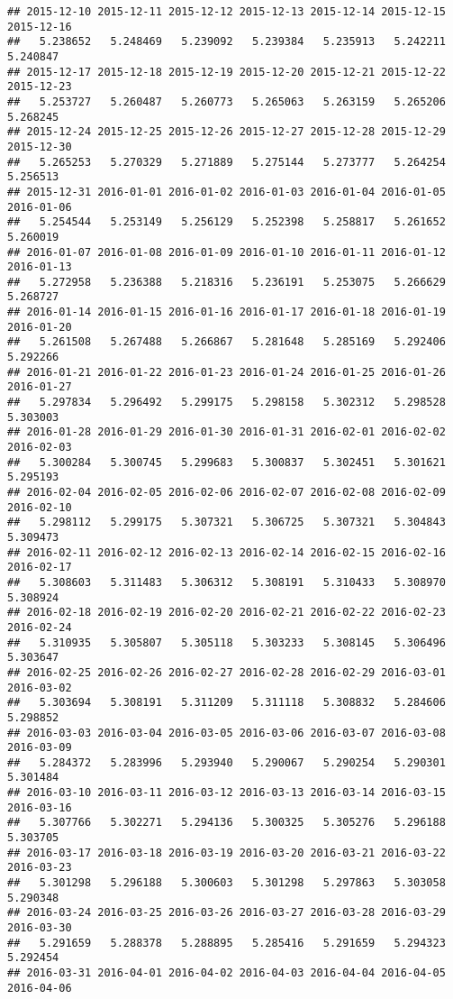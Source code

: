 \documentclass[
]{article}
\begin{document}
\begin{verbatim}
## 2015-12-10 2015-12-11 2015-12-12 2015-12-13 2015-12-14 2015-12-15 2015-12-16 
##   5.238652   5.248469   5.239092   5.239384   5.235913   5.242211   5.240847 
## 2015-12-17 2015-12-18 2015-12-19 2015-12-20 2015-12-21 2015-12-22 2015-12-23 
##   5.253727   5.260487   5.260773   5.265063   5.263159   5.265206   5.268245 
## 2015-12-24 2015-12-25 2015-12-26 2015-12-27 2015-12-28 2015-12-29 2015-12-30 
##   5.265253   5.270329   5.271889   5.275144   5.273777   5.264254   5.256513 
## 2015-12-31 2016-01-01 2016-01-02 2016-01-03 2016-01-04 2016-01-05 2016-01-06 
##   5.254544   5.253149   5.256129   5.252398   5.258817   5.261652   5.260019 
## 2016-01-07 2016-01-08 2016-01-09 2016-01-10 2016-01-11 2016-01-12 2016-01-13 
##   5.272958   5.236388   5.218316   5.236191   5.253075   5.266629   5.268727 
## 2016-01-14 2016-01-15 2016-01-16 2016-01-17 2016-01-18 2016-01-19 2016-01-20 
##   5.261508   5.267488   5.266867   5.281648   5.285169   5.292406   5.292266 
## 2016-01-21 2016-01-22 2016-01-23 2016-01-24 2016-01-25 2016-01-26 2016-01-27 
##   5.297834   5.296492   5.299175   5.298158   5.302312   5.298528   5.303003 
## 2016-01-28 2016-01-29 2016-01-30 2016-01-31 2016-02-01 2016-02-02 2016-02-03 
##   5.300284   5.300745   5.299683   5.300837   5.302451   5.301621   5.295193 
## 2016-02-04 2016-02-05 2016-02-06 2016-02-07 2016-02-08 2016-02-09 2016-02-10 
##   5.298112   5.299175   5.307321   5.306725   5.307321   5.304843   5.309473 
## 2016-02-11 2016-02-12 2016-02-13 2016-02-14 2016-02-15 2016-02-16 2016-02-17 
##   5.308603   5.311483   5.306312   5.308191   5.310433   5.308970   5.308924 
## 2016-02-18 2016-02-19 2016-02-20 2016-02-21 2016-02-22 2016-02-23 2016-02-24 
##   5.310935   5.305807   5.305118   5.303233   5.308145   5.306496   5.303647 
## 2016-02-25 2016-02-26 2016-02-27 2016-02-28 2016-02-29 2016-03-01 2016-03-02 
##   5.303694   5.308191   5.311209   5.311118   5.308832   5.284606   5.298852 
## 2016-03-03 2016-03-04 2016-03-05 2016-03-06 2016-03-07 2016-03-08 2016-03-09 
##   5.284372   5.283996   5.293940   5.290067   5.290254   5.290301   5.301484 
## 2016-03-10 2016-03-11 2016-03-12 2016-03-13 2016-03-14 2016-03-15 2016-03-16 
##   5.307766   5.302271   5.294136   5.300325   5.305276   5.296188   5.303705 
## 2016-03-17 2016-03-18 2016-03-19 2016-03-20 2016-03-21 2016-03-22 2016-03-23 
##   5.301298   5.296188   5.300603   5.301298   5.297863   5.303058   5.290348 
## 2016-03-24 2016-03-25 2016-03-26 2016-03-27 2016-03-28 2016-03-29 2016-03-30 
##   5.291659   5.288378   5.288895   5.285416   5.291659   5.294323   5.292454 
## 2016-03-31 2016-04-01 2016-04-02 2016-04-03 2016-04-04 2016-04-05 2016-04-06 

\end{verbatim}
\end{document}
